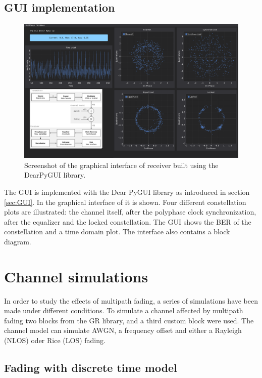 \subsection{GUI implementation}
\begin{figure}
	\centering
	\includegraphics[frame, width = \linewidth]{figures/screenshots/gui_screenshot}
	\caption{Screenshot of the graphical interface of receiver built using the DearPyGUI library.
	\label{fig:GUI}}
\end{figure}

The GUI is implemented with the Dear PyGUI library as introduced in section \ref{sec:GUI}. In  the graphical interface of it is shown. 
Four different constellation plots are illustrated: the channel itself, after the polyphase clock synchronization, after the equalizer and the locked constellation.
The GUI shows the BER of the constellation and a time domain plot. The interface also contains a block diagram.


\section{Channel simulations}

In order to study the effects of multipath fading, a series of simulations have been made under different conditions. To simulate a channel affected by multipath fading two blocks from the GR library, and a third custom block were used. The channel model can simulate AWGN, a frequency offset and either a Rayleigh (NLOS) oder Rice (LOS) fading.

\subsection{Fading with discrete time model} \label{sec:discrete-time-model-fir}

